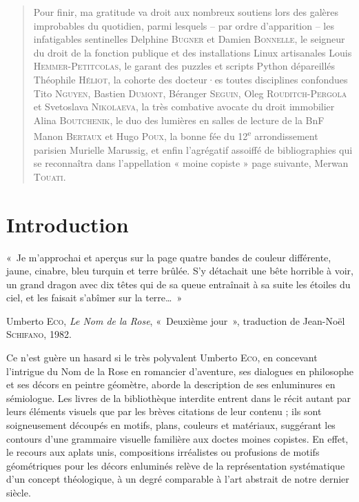 \documentclass[a4paper,12pt, twoside]{book}
\begin{document}
\begin{quote}
\small{Pour finir, ma gratitude va droit aux nombreux soutiens lors des galères improbables du quotidien, parmi lesquels – par ordre d’apparition – les infatigables sentinelles Delphine \textsc{Bugner} et Damien \textsc{Bonnelle}, le seigneur du droit de la fonction publique et des installations Linux artisanales Louis \textsc{Hemmer-Petitcolas}, le garant des puzzles et scripts Python dépareillés Théophile \textsc{Héliot}, la cohorte des docteur·es toutes disciplines confondues Tito \textsc{Nguyen}, Bastien \textsc{Dumont}, Béranger \textsc{Seguin}, Oleg \textsc{Rouditch-Pergola} et Svetoslava \textsc{Nikolaeva}, la très combative avocate du droit immobilier Alina \textsc{Boutchenik}, le duo des lumières en salles de lecture de la BnF Manon \textsc{Bertaux} et Hugo \textsc{Poux}, la bonne fée du 12\textsuperscript{e} arrondissement parisien Murielle {Marussig}, et enfin l’agrégatif assoiffé de bibliographies qui se reconnaîtra dans l’appellation « moine copiste » page suivante, Merwan \textsc{Touati}.}
\end{quote}

\clearemptydoublepage
\chapter*{Introduction}

\begin{flushright}
\scriptsize\textcolor{teal3}{«~Je m’approchai et aperçus sur la page quatre bandes de couleur différente, jaune, cinabre, bleu turquin et terre brûlée. S’y détachait une bête horrible à voir, un grand dragon avec dix têtes qui de sa queue entraînait à sa suite les étoiles du ciel, et les faisait s’abîmer sur la terre…~»}\\

\medskip

\textcolor{teal3}{Umberto \textsc{Eco}, \textit{Le Nom de la Rose}, «~Deuxième jour~», traduction de Jean-Noël \textsc{Schifano}, 1982.}
\end{flushright}
\normalsize
\bigskip

Ce n’est guère un hasard si le très polyvalent Umberto \textsc{Eco}, en concevant l’intrigue du Nom de la Rose en romancier d’aventure, ses dialogues en philosophe et ses décors en peintre géomètre, aborde la description de ses enluminures en sémiologue. Les livres de la bibliothèque interdite entrent dans le récit autant par leurs éléments visuels que par les brèves citations de leur contenu ; ils sont soigneusement découpés en motifs, plans, couleurs et matériaux, suggérant les contours d’une grammaire visuelle familière aux doctes moines copistes. En effet, le recours aux aplats unis, compositions irréalistes ou profusions de motifs géométriques pour les décors enluminés relève de la représentation systématique d’un concept théologique, à un degré comparable à l’art abstrait de notre dernier siècle.
\end{document}
